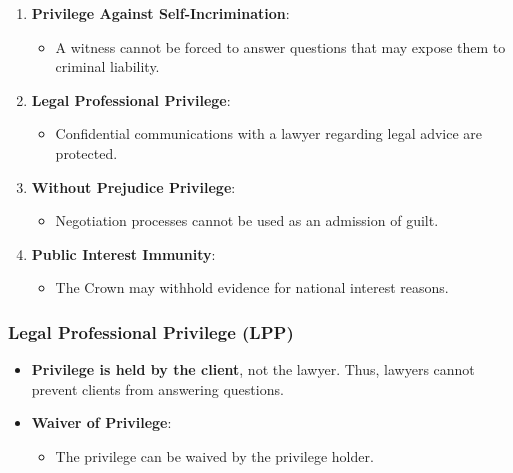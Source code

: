 \begin{enumerate}
\def\labelenumi{\arabic{enumi}.}
\tightlist
\item
  \textbf{Privilege Against Self-Incrimination}:

  \begin{itemize}
  \tightlist
  \item
    A witness cannot be forced to answer questions that may expose them
    to criminal liability.
  \end{itemize}
\item
  \textbf{Legal Professional Privilege}:

  \begin{itemize}
  \tightlist
  \item
    Confidential communications with a lawyer regarding legal advice are
    protected.
  \end{itemize}
\item
  \textbf{Without Prejudice Privilege}:

  \begin{itemize}
  \tightlist
  \item
    Negotiation processes cannot be used as an admission of guilt.
  \end{itemize}
\item
  \textbf{Public Interest Immunity}:

  \begin{itemize}
  \tightlist
  \item
    The Crown may withhold evidence for national interest reasons.
  \end{itemize}
\end{enumerate}

\subsubsection{Legal Professional Privilege
(LPP)}\label{legal-professional-privilege-lpp}

\begin{itemize}
\tightlist
\item
  \textbf{Privilege is held by the client}, not the lawyer. Thus,
  lawyers cannot prevent clients from answering questions.
\item
  \textbf{Waiver of Privilege}:

  \begin{itemize}
  \tightlist
  \item
    The privilege can be waived by the privilege holder.
  \end{itemize}
\end{itemize}

